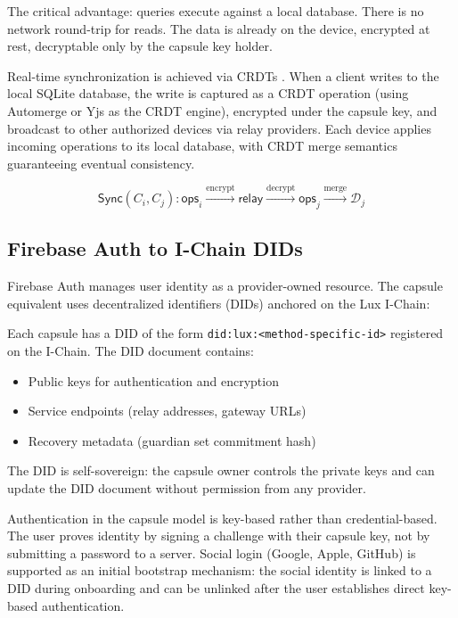 The critical advantage: queries execute against a local database. There
is no network round-trip for reads. The data is already on the device,
encrypted at rest, decryptable only by the capsule key holder.

Real-time synchronization is achieved via CRDTs \cite{shapiro2011crdt}.
When a client writes to the local SQLite database, the write is captured
as a CRDT operation (using Automerge \cite{kleppmann2017automerge} or
Yjs \cite{nicolaescu2015yjs} as the CRDT engine), encrypted under the
capsule key, and broadcast to other authorized devices via relay providers.
Each device applies incoming operations to its local database, with CRDT
merge semantics guaranteeing eventual consistency.

\begin{equation}
    \mathsf{Sync}(C_i, C_j) : \mathsf{ops}_i \xrightarrow{\text{encrypt}} \mathsf{relay} \xrightarrow{\text{decrypt}} \mathsf{ops}_j \xrightarrow{\text{merge}} \mathcal{D}_j
\end{equation}

\subsection{Firebase Auth to I-Chain DIDs}

Firebase Auth manages user identity as a provider-owned resource. The
capsule equivalent uses decentralized identifiers (DIDs) anchored on
the Lux I-Chain:

\begin{definition}
Each capsule has a DID of the form \texttt{did:lux:<method-specific-id>}
registered on the I-Chain. The DID document contains:
\begin{itemize}
    \item Public keys for authentication and encryption
    \item Service endpoints (relay addresses, gateway URLs)
    \item Recovery metadata (guardian set commitment hash)
\end{itemize}
The DID is self-sovereign: the capsule owner controls the private keys
and can update the DID document without permission from any provider.
\end{definition}

Authentication in the capsule model is key-based rather than
credential-based. The user proves identity by signing a challenge
with their capsule key, not by submitting a password to a server.
Social login (Google, Apple, GitHub) is supported as an initial
bootstrap mechanism: the social identity is linked to a DID during
onboarding and can be unlinked after the user establishes direct
key-based authentication.


